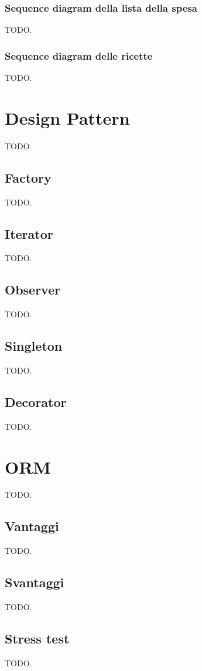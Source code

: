 \documentclass{article}
\begin{document}
\subsubsection{Sequence diagram della lista della spesa}

TODO.

\subsubsection{Sequence diagram delle ricette}

TODO.

\section{Design Pattern}

TODO.

\subsection{Factory}

TODO.

\subsection{Iterator}

TODO.

\subsection{Observer}

TODO.

\subsection{Singleton}

TODO.

\subsection{Decorator}

TODO.

\section{ORM}

TODO.

\subsection{Vantaggi}

TODO.

\subsection{Svantaggi}

TODO.

\subsection{Stress test}

TODO.
\end{document}
